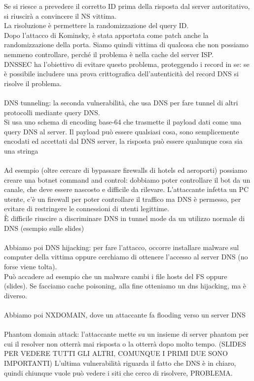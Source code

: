 \documentclass[12pt, oneside]{extbook} %
\begin{document}
Se si riesce a prevedere il corretto ID prima della risposta dal server autoritativo, si riuscirà a convincere il NS vittima.\\La risoluzione è permettere la randomizzazione del query ID.\\Dopo l'attacco di Kominsky, è stata apportata come patch anche la randomizzazione della porta. Siamo quindi vittima di qualcosa che non possiamo nemmeno controllare, perché il problema è nella cache del server ISP.\\DNSSEC ha l'obiettivo di evitare questo problema, proteggendo i record in se: se è possibile includere una prova crittografica dell'autenticità del record DNS si risolve il problema.\\\\DNS tunneling: la seconda vulnerabilità, che usa DNS per fare tunnel di altri protocolli mediante query DNS.\\Si usa uno schema di encoding base-64 che trasmette il payload dati come una query DNS al server. Il payload può essere qualsiasi cosa, sono semplicemente encodati ed accettati dal DNS server, la risposta può essere qualunque cosa sia una stringa\\\\Ad esempio (oltre cercare di bypassare firewalls di hotels ed aeroporti) possiamo creare una botnet command and control: dobbiamo poter controllare il bot da un canale, che deve essere nascosto e difficile da rilevare. L'attaccante infetta un PC utente, c'è un firewall per poter controllare il traffico ma DNS è permesso, per evitare di restringere le connessioni di utenti legittime.\\È difficile riuscire a discriminare DNS in tunnel mode da un utilizzo normale di DNS (esempio sulle slides)\\\\Abbiamo poi DNS hijacking: per fare l'attacco, occorre installare malware sul computer della vittima oppure cerchiamo di ottenere l'accesso al server DNS (no forse viene tolta).\\Può accadere ad esempio che un malware cambi i file hosts del FS oppure (slides). Se facciamo cache poisoning, alla fine otteniamo un dns hijacking, ma è diverso.\\\\Abbiamo poi NXDOMAIN, dove un attaccante fa flooding verso un server DNS\\\\Phantom domain attack: l'attaccante mette su un insieme di server phantom per cui il resolver non otterrà mai risposta o la otterrà dopo molto tempo. (SLIDES PER VEDERE TUTTI GLI ALTRI, COMUNQUE I PRIMI DUE SONO IMPORTANTI)
L'ultima vulnerabilità riguarda il fatto che DNS è in chiaro, quindi chiunque vuole può vedere i siti che cerco di risolvere, PROBLEMA.
\end{document}
